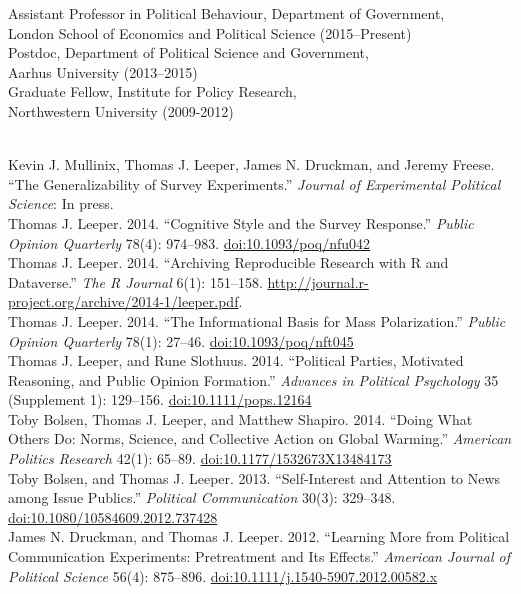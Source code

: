 \documentclass[12pt]{article}
\renewcommand{\section}[1]{\pagebreak[3]%
    \llap{\scshape\smash{\parbox[t]{\marginparwidth}{\raggedright {\color{lg}#1}}}}%
    \vspace{-\baselineskip}\par}
\newcommand{\topic}[1]{\pagebreak[3]\indent {\color{lg}{\footnotesize #1 }}\\}
\newcommand{\entry}[1]{\indent {\color{lg}\guillemotright}\hspace{2pt}#1\vspace{.25em}\\}
\begin{document}
\section{Academic Appointments}
\entry{Assistant Professor in Political Behaviour, Department of Government,\\ London School of Economics and Political Science (2015--Present)}
\entry{Postdoc, Department of Political Science and Government,\\ Aarhus University (2013--2015)}
\entry{Graduate Fellow, Institute for Policy Research,\\ Northwestern University (2009-2012)}

\section{Publications}
\topic{Peer-Reviewed Publications}
\entry{Kevin J. Mullinix, Thomas J. Leeper, James N. Druckman, and Jeremy Freese. ``The Generalizability of Survey Experiments.'' {\em Journal of Experimental Political Science}: In press.}
\entry{Thomas J. Leeper. 2014. ``Cognitive Style and the Survey Response.'' {\em Public Opinion Quarterly} 78(4): 974--983. \href{http://dx.doi.org/10.1093/poq/nfu042}{doi:10.1093/poq/nfu042}}
\entry{Thomas J. Leeper. 2014. ``Archiving Reproducible Research with R and Dataverse.'' {\em The R Journal} 6(1): 151--158. \href{http://journal.r-project.org/archive/2014-1/leeper.pdf}{http://journal.r-project.org/archive/2014-1/leeper.pdf}.}
\entry{Thomas J. Leeper. 2014. ``The Informational Basis for Mass Polarization.'' {\em Public Opinion Quarterly} 78(1): 27--46. \href{http://dx.doi.org/10.1093/poq/nft045}{doi:10.1093/poq/nft045}}
\entry{Thomas J. Leeper, and Rune Slothuus. 2014. ``Political Parties, Motivated Reasoning, and Public Opinion Formation.'' {\em Advances in Political Psychology} 35 (Supplement 1): 129--156. \href{http://dx.doi.org/10.1111/pops.12164}{doi:10.1111/pops.12164}}
\entry{Toby Bolsen, Thomas J. Leeper, and Matthew Shapiro. 2014. ``Doing What Others Do: Norms, Science, and Collective Action on Global Warming.'' {\em American Politics Research} 42(1): 65--89. \href{http://dx.doi.org/10.1177/1532673X13484173}{doi:10.1177/1532673X13484173}}
\entry{Toby Bolsen, and Thomas J. Leeper. 2013. ``Self-Interest and Attention to News among Issue Publics.'' {\em Political Communication} 30(3): 329--348.\\ \href{http://dx.doi.org/10.1080/10584609.2012.737428}{doi:10.1080/10584609.2012.737428}}
\entry{James N. Druckman, and Thomas J. Leeper. 2012. ``Learning More from Political Communication Experiments: Pretreatment and Its Effects.'' {\em American Journal of Political Science} 56(4): 875--896. \href{http://dx.doi.org/10.1111/j.1540-5907.2012.00582.x}{doi:10.1111/j.1540-5907.2012.00582.x}}
\end{document}
